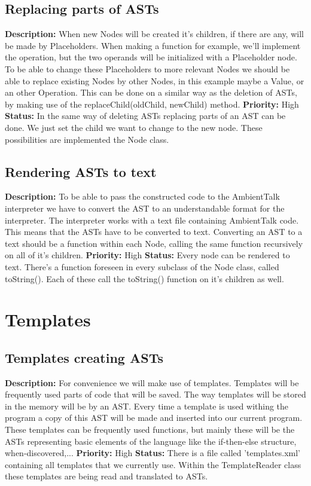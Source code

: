 \documentclass[a4paper,12pt]{report}
\begin{document}
\subsection{Replacing parts of ASTs}
\textbf{Description: }When new Nodes will be created it's children, if there are any, will be made by Placeholders. When making a function for example, we'll implement the operation,
but the two operands will be initialized with a Placeholder node. To be able to change these Placeholders to more relevant Nodes we should be able to 
replace existing Nodes by other Nodes, in this example maybe a Value, or an other Operation. This can be done on a similar way as the deletion of ASTs, by making use of the replaceChild(oldChild, newChild) method.\newline
\textbf{Priority:} High \newline
\textbf{Status: } In the same way of deleting ASTs replacing parts of an AST can be done. We just set the child we want to change to the 
new node. These possibilities are implemented the Node class.\newline
\subsection{Rendering ASTs to text}
\textbf{Description: } To be able to pass the constructed code to the AmbientTalk interpreter we have to convert the AST to an understandable format for the interpreter. The 
interpreter works with a text file containing AmbientTalk code. This means that the ASTs have to be converted to text. Converting an
AST to a text should be a function within each Node, calling the same function recursively on all of it's children.\newline
\textbf{Priority:} High \newline
\textbf{Status: } Every node can be rendered to text. There's a function foreseen in every subclass of the Node class, called toString(). 
Each of these call the toString() function on it's children as well.\newline
\section{Templates} 
\subsection{Templates creating ASTs}
\textbf{Description: } For convenience we will make use of templates. Templates will be frequently used parts of code that will be saved. The way templates will be stored in the 
memory will be by an AST. Every time a template is used withing the program a copy of this AST will be made and inserted into our current program.
These templates can be frequently used functions, but mainly these will be the ASTs representing basic elements of the language like the if-then-else structure, when-discovered,...\newline
\textbf{Priority:} High \newline
\textbf{Status: }There is a file called 'templates.xml' containing all templates that we currently use. Within the TemplateReader class these templates are being read and translated to ASTs. \newline
\end{document}
